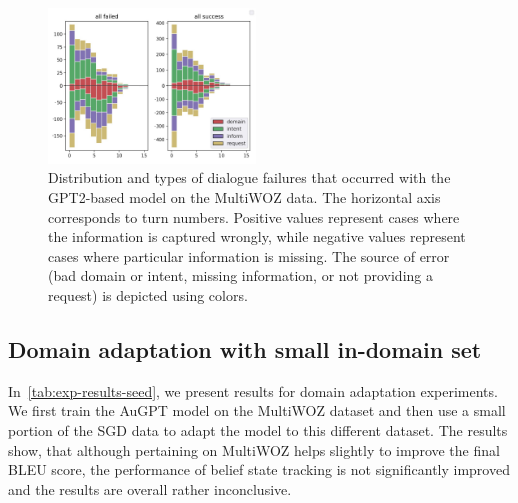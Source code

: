 \begin{figure}[tp]
    \centering  \small
    \includegraphics[width=0.49\textwidth]{images/hist-vert-True-gpt.jpg}
    \caption{Distribution and types of dialogue failures that occurred with the GPT2-based model on the MultiWOZ data.
    The horizontal axis corresponds to turn numbers. Positive values represent cases where the information is captured wrongly, while negative values represent cases where particular information is missing.
    The source of error (bad domain or intent, missing information, or not providing a request) is depicted using colors.}
    \label{fig:error_distr}
\end{figure}


\subsection{Domain adaptation with small in-domain set}
In~\ref{tab:exp-results-seed}, we present results for domain adaptation experiments.
We first train the AuGPT model on the MultiWOZ dataset and then use a small portion of the SGD data to adapt the model to this different dataset.
The results show, that although pertaining on MultiWOZ helps slightly to improve the final BLEU score, the performance of belief state tracking is not significantly improved and the results are overall rather inconclusive.

